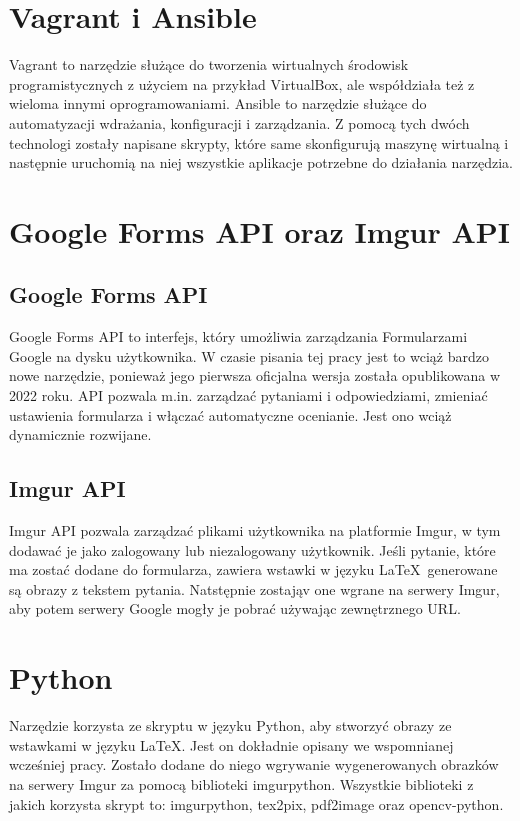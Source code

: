 \section{Vagrant i Ansible}
Vagrant to narzędzie służące do tworzenia wirtualnych środowisk programistycznych
z użyciem na przykład VirtualBox, ale współdziała też z wieloma innymi oprogramowaniami.
Ansible to narzędzie służące do automatyzacji
wdrażania, konfiguracji i zarządzania. Z pomocą tych dwóch technologi zostały
napisane skrypty, które same skonfigurują maszynę wirtualną i następnie uruchomią
na niej wszystkie aplikacje potrzebne do działania narzędzia. 

\section{Google Forms API oraz Imgur API}

\subsection*{Google Forms API}
Google Forms API to interfejs, który umożliwia zarządzania Formularzami Google na dysku
użytkownika. W czasie pisania tej pracy jest to wciąż bardzo nowe narzędzie, ponieważ
jego pierwsza oficjalna wersja została opublikowana w 2022 roku. API pozwala m.in. zarządzać
pytaniami i odpowiedziami, zmieniać ustawienia formularza i włączać automatyczne ocenianie.
Jest ono wciąż dynamicznie rozwijane.

\subsection*{Imgur API}
Imgur API pozwala zarządzać plikami użytkownika na platformie Imgur, w tym dodawać je jako
zalogowany lub niezalogowany użytkownik. Jeśli pytanie, które ma zostać dodane do formularza, 
zawiera wstawki w języku \LaTeX\, generowane są obrazy z tekstem pytania. Natstępnie 
zostająv one wgrane na serwery Imgur, aby potem serwery Google
mogły je pobrać używając zewnętrznego URL.

\section{Python}
Narzędzie korzysta ze skryptu w języku Python, aby stworzyć obrazy ze wstawkami w języku \LaTeX.
Jest on dokładnie opisany we wspomnianej wcześniej pracy. Zostało dodane do niego wgrywanie 
wygenerowanych obrazków na serwery Imgur za pomocą biblioteki imgurpython.
Wszystkie biblioteki z jakich korzysta skrypt to: imgurpython, tex2pix, pdf2image oraz
opencv-python.

